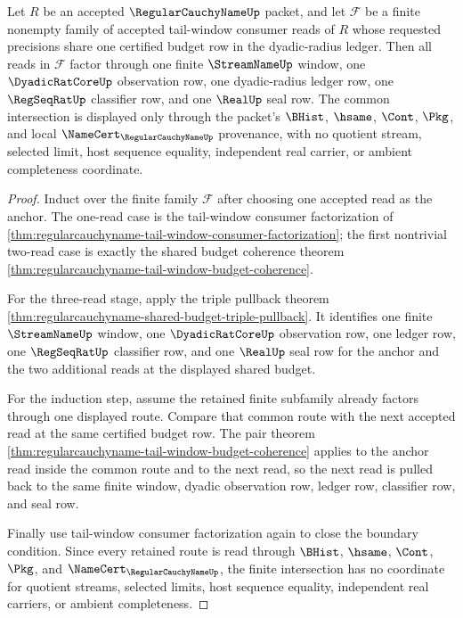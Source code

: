 \begin{theorem}
\label{thm:regularcauchyname-shared-budget-finite-intersection}
Let $R$ be an accepted $\RegularCauchyNameUp$ packet, and let $\mathcal{F}$ be a finite nonempty family of accepted tail-window consumer reads of $R$ whose requested precisions share one certified budget row in the dyadic-radius ledger. Then all reads in $\mathcal{F}$ factor through one finite $\StreamNameUp$ window, one $\DyadicRatCoreUp$ observation row, one dyadic-radius ledger row, one $\RegSeqRatUp$ classifier row, and one $\RealUp$ seal row. The common intersection is displayed only through the packet's $\BHist$, $\hsame$, $\Cont$, $\Pkg$, and local $\NameCert_{\RegularCauchyNameUp}$ provenance, with no quotient stream, selected limit, host sequence equality, independent real carrier, or ambient completeness coordinate.
\end{theorem}
\begin{proof}
Induct over the finite family $\mathcal{F}$ after choosing one accepted read as the anchor. The one-read case is the tail-window consumer factorization of \autoref{thm:regularcauchyname-tail-window-consumer-factorization}; the first nontrivial two-read case is exactly the shared budget coherence theorem \autoref{thm:regularcauchyname-tail-window-budget-coherence}.

For the three-read stage, apply the triple pullback theorem \autoref{thm:regularcauchyname-shared-budget-triple-pullback}. It identifies one finite $\StreamNameUp$ window, one $\DyadicRatCoreUp$ observation row, one ledger row, one $\RegSeqRatUp$ classifier row, and one $\RealUp$ seal row for the anchor and the two additional reads at the displayed shared budget.

For the induction step, assume the retained finite subfamily already factors through one displayed route. Compare that common route with the next accepted read at the same certified budget row. The pair theorem \autoref{thm:regularcauchyname-tail-window-budget-coherence} applies to the anchor read inside the common route and to the next read, so the next read is pulled back to the same finite window, dyadic observation row, ledger row, classifier row, and seal row.

Finally use tail-window consumer factorization again to close the boundary condition. Since every retained route is read through $\BHist$, $\hsame$, $\Cont$, $\Pkg$, and $\NameCert_{\RegularCauchyNameUp}$, the finite intersection has no coordinate for quotient streams, selected limits, host sequence equality, independent real carriers, or ambient completeness.
\end{proof}

